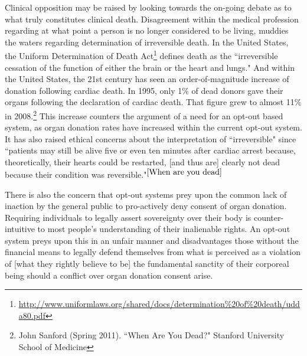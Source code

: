 \documentclass[letterpaper,10pt,twoside]{article}
\begin{document}
Clinical opposition may be raised by looking towards the on-going debate as to what truly constitutes clinical death.  Disagreement within the medical profession regarding at what point a person is no longer considered to be living, muddies the waters regarding determination of irreversible death.  In the United States, the Uniform Determination of Death Act\footnote{\url{http://www.uniformlaws.org/shared/docs/determination\%20of\%20death/udda80.pdf}} defines death as the ``irreversible cessation of the function of either the brain or the heart and lungs."  And within the United States, the 21st century has seen an order-of-magnitude increase of donation following cardiac death.  In 1995, only 1\% of dead donors gave their organs following the declaration of cardiac death.  That figure grew to almost 11\% in 2008.\footnote{\label{When are you dead}John Sanford (Spring 2011). ``When Are You Dead?" Stanford University School of Medicine}  This increase counters the argument of a need for an opt-out based system, as organ donation rates have increased within the current opt-out system.  It has also raised ethical concerns about the interpretation of ``irreversible" since ``patients may still be alive five or even ten minutes after cardiac arrest because, theoretically, their hearts could be restarted, [and thus are] clearly not dead because their condition was reversible."$^{\ref{When are you dead}}$  

There is also the concern that opt-out systems prey upon the common lack of inaction by the general public to pro-actively deny consent of organ donation.  Requiring individuals to legally assert sovereignty over their body is counter-intuitive to most people's understanding of their inalienable rights.  An opt-out system preys upon this in an unfair manner and disadvantages those without the financial means to legally defend themselves from what is perceived as a violation of [what they rightly believe to be] the fundamental sanctity of their corporeal being should a conflict over organ donation consent arise.
\end{document}
